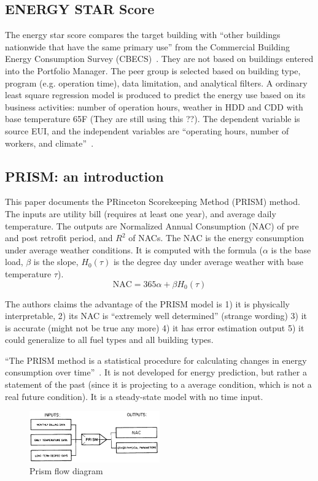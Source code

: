 \documentclass[12pt]{article}
\begin{document}
\subsection{ENERGY STAR Score~\cite{energyStarDoc}}
The energy star score compares the target building with ``other
buildings nationwide that have the same primary use'' from the
Commercial Building Energy Consumption Survey
(CBECS)~\cite{energyStarScore}. They are not based on buildings
entered into the Portfolio Manager. The peer group is selected based
on building type, program (e.g. operation time), data limitation, and
analytical filters. A ordinary least square regression model is
produced to predict the energy use based on its business activities:
number of operation hours, weather in HDD and CDD with base
temperature 65F (They are still using this ??). The dependent variable
is source EUI, and the independent variables are ``operating hours,
number of workers, and climate''~\cite{energyStarDoc}.
\subsection{PRISM: an introduction~\cite{fels1986prism}}
This paper documents the PRinceton Scorekeeping Method (PRISM)
method. The inputs are utility bill (requires at least one year), and
average daily temperature. The outputs are Normalized Annual
Consumption (NAC) of pre and post retrofit period, and $R^2$ of
NACs. The NAC is the energy consumption under average weather
conditions. It is computed with the formula ($\alpha$ is the base
load, $\beta$ is the slope, $H_0(\tau)$ is the degree day under
average weather with base temperature $\tau$).
\begin{equation}
  \label{eq:nac}
  \text{NAC} = 365\alpha + \beta H_0(\tau)
\end{equation}

The authors claims the advantage of the PRISM model is 1) it is
physically interpretable, 2) its NAC is ``extremely well determined''
(strange wording) 3) it is accurate (might not be true any more) 4) it
has error estimation output 5) it could generalize to all fuel types
and all building types.

``The PRISM method is a statistical procedure for calculating changes
in energy consumption over time''~\cite{fels1986prism}. It is not
developed for energy prediction, but rather a statement of the past
(since it is projecting to a average condition, which is not a real
future condition). It is a steady-state model with no time input.
\begin{figure}[h!]
  \centering
  \includegraphics[width=0.5\textwidth]{images/prism.png}
  \caption{Prism flow diagram}
  \label{fig:prism}
\end{figure}
\FloatBarrier
\end{document}
